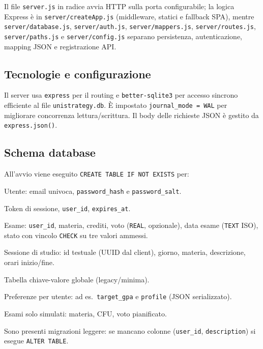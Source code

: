 \documentclass[11pt,a4paper]{article}
\begin{document}
Il file \texttt{server.js} in radice avvia HTTP sulla porta configurabile; la logica Express è in \texttt{server/createApp.js} (middleware, statici e fallback SPA), mentre \texttt{server/database.js}, \texttt{server/auth.js}, \texttt{server/mappers.js}, \texttt{server/routes.js}, \texttt{server/paths.js} e \texttt{server/config.js} separano persistenza, autenticazione, mapping JSON e registrazione API.

\subsection{Tecnologie e configurazione}
Il server usa \texttt{express} per il routing e \texttt{better-sqlite3} per accesso sincrono efficiente al file \texttt{unistrategy.db}. È impostato \texttt{journal\_mode = WAL} per migliorare concorrenza lettura/scrittura. Il body delle richieste JSON è gestito da \texttt{express.json()}.

\subsection{Schema database}
All'avvio viene eseguito \texttt{CREATE TABLE IF NOT EXISTS} per:
\begin{description}[style=nextline]
  \item[\texttt{users}] Utente: email univoca, \texttt{password\_hash} e \texttt{password\_salt}.
  \item[\texttt{user\_sessions}] Token di sessione, \texttt{user\_id}, \texttt{expires\_at}.
  \item[\texttt{exams}] Esame: \texttt{user\_id}, materia, crediti, voto (\texttt{REAL}, opzionale), data esame (\texttt{TEXT} ISO), stato con vincolo \texttt{CHECK} su tre valori ammessi.
  \item[\texttt{study\_sessions}] Sessione di studio: id testuale (UUID dal client), giorno, materia, descrizione, orari inizio/fine.
  \item[\texttt{settings}] Tabella chiave-valore globale (legacy/minima).
  \item[\texttt{user\_settings}] Preferenze per utente: ad es.\ \texttt{target\_gpa} e \texttt{profile} (JSON serializzato).
  \item[\texttt{simulated\_exams}] Esami solo simulati: materia, CFU, voto pianificato.
\end{description}
Sono presenti migrazioni leggere: se mancano colonne (\texttt{user\_id}, \texttt{description}) si esegue \texttt{ALTER TABLE}.
\end{document}
